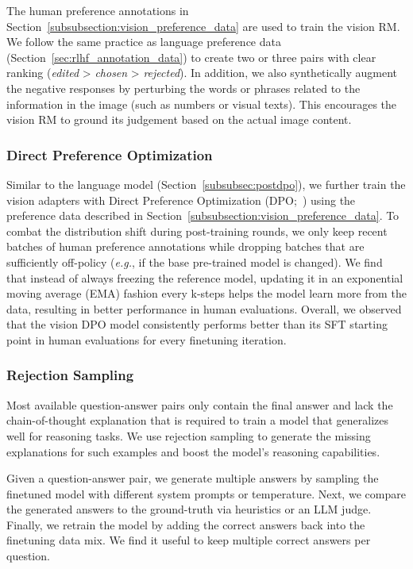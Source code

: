 The human preference annotations in Section~\ref{subsubsection:vision_preference_data} are used to train the vision RM. We follow the same practice as language preference data (Section~\ref{sec:rlhf_annotation_data}) to create two or three pairs with clear ranking (\emph{edited} > \emph{chosen} > \emph{rejected}). In addition, we also synthetically augment the negative responses by perturbing the words or phrases related to the information in the image (such as numbers or visual texts). This encourages the vision RM to ground its judgement based on the actual image content.

\subsubsection{Direct Preference Optimization}
\label{subsubsec:dpo}
Similar to the language model (Section~\ref{subsubsec:postdpo}), we further train the vision adapters with Direct Preference Optimization (DPO;~\cite{rafailov2023dpo}) using the preference data described in Section~\ref{subsubsection:vision_preference_data}. To combat the distribution shift during post-training rounds, we only keep recent batches of human preference annotations while dropping batches that are sufficiently off-policy (\textit{e.g.}, if the base pre-trained model is changed). We find that instead of always freezing the reference model, updating it in an exponential moving average (EMA) fashion every k-steps helps the model learn more from the data, resulting in better performance in human evaluations. Overall, we observed that the vision DPO model consistently performs better than its SFT starting point in human evaluations for every finetuning iteration.

\subsubsection{Rejection Sampling}
\label{subsubsection:vision_rejection_sampling}
Most available question-answer pairs only contain the final answer and lack the chain-of-thought explanation that is required to train a model that generalizes well for reasoning tasks. We use rejection sampling to generate the missing explanations for such examples and boost the model's reasoning capabilities.

Given a question-answer pair, we generate multiple answers by sampling the finetuned model with different system prompts or temperature. Next, we compare the generated answers to the ground-truth via heuristics or an LLM judge. Finally, we retrain the model by adding the correct answers back into the finetuning data mix. We find it useful to keep multiple correct answers per question.


